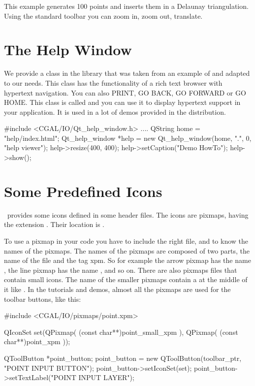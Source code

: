\ccExample
{}

This example generates 100 points and inserts them in a Delaunay
triangulation. Using the standard toolbar you can zoom in, zoom out,
translate.

\section{The Help Window}
\label{The Help Window}

We provide a class in the  library that was taken from
an example of  and adapted to our needs. This class has the
functionality of a rich text browser with hypertext navigation. You
can also PRINT, GO BACK, GO FORWARD or GO HOME. This class is called
 and you can use it to display hypertext support
in your application. It is used in a lot of demos provided in the
distribution.

\ccExample
\begin{ccExampleCode}
    #include <CGAL/IO/Qt_help_window.h>
        ....
    QString home = "help/index.html";
    Qt_help_window *help = new Qt_help_window(home, ".", 0, "help viewer");
    help->resize(400, 400);
    help->setCaption("Demo HowTo");
    help->show();
\end{ccExampleCode}

\section{Some Predefined Icons}
\label{The predefined icons}

\cgal\ provides some icons defined in some header files. The icons are
pixmaps, having the extension . Their location is .

To use a pixmap in your code you have to include the right file, and
to know the names of the pixmaps. The names of the pixmaps are
composed of two parts, the name of the file and the tag xpm. So for
example the arrow pixmap has the name , the line
pixmap has the name , and so on. There are also 
pixmaps files that contain small icons. The name of the smaller 
pixmaps contain a  at the middle of it like .
In the tutorials and demos, almost all the pixmaps are used for the 
toolbar buttons, like this:

\ccExample
\begin{ccExampleCode}
    
    #include <CGAL/IO/pixmaps/point.xpm>
    
    QIconSet set(QPixmap( (const char**)point_small_xpm ),
                  QPixmap( (const char**)point_xpm ));

    QToolButton *point_button;
    point_button = new QToolButton(toolbar_ptr, "POINT INPUT BUTTON");
    point_button->setIconSet(set);
    point_button->setTextLabel("POINT INPUT LAYER");

\end{ccExampleCode}



